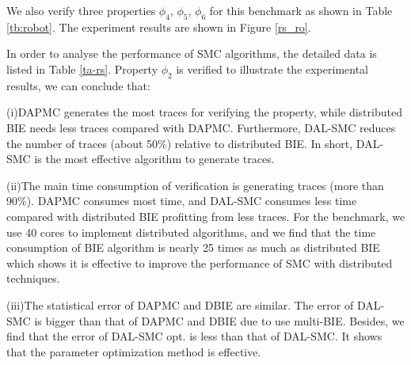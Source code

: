 We also verify three properties $\phi_4$, $\phi_5$, $\phi_6$ for this benchmark as shown in Table \ref{tb:robot}. The experiment results are shown in Figure \ref{rs_ro}. 

In order to analyse the performance of SMC algorithms, the detailed data is listed in Table \ref{ta-rs}. Property $\phi_2$ is verified to illustrate the experimental results, we can conclude that: 

(i)DAPMC generates the most traces for verifying the property, while distributed BIE needs less traces compared with DAPMC. Furthermore, DAL-SMC reduces the number of traces (about 50\%) relative to distributed BIE.  In short, DAL-SMC is the most effective algorithm to generate traces.

(ii)The main time consumption of verification is generating traces (more than 90\%). DAPMC consumes most time, and DAL-SMC consumes less time compared with distributed BIE profitting from less traces. For the benchmark, we use 40 cores to implement distributed algorithms, and we find that the time consumption of BIE algorithm is nearly 25 times as much as distributed BIE which shows it is effective to improve the performance of SMC with distributed techniques. 

(iii)The statistical error of DAPMC and DBIE are similar. The error of DAL-SMC is bigger than that of DAPMC and DBIE due to use multi-BIE. Besides, we find that the error of DAL-SMC opt. is less than that of DAL-SMC. It shows that the parameter optimization method is effective. 

